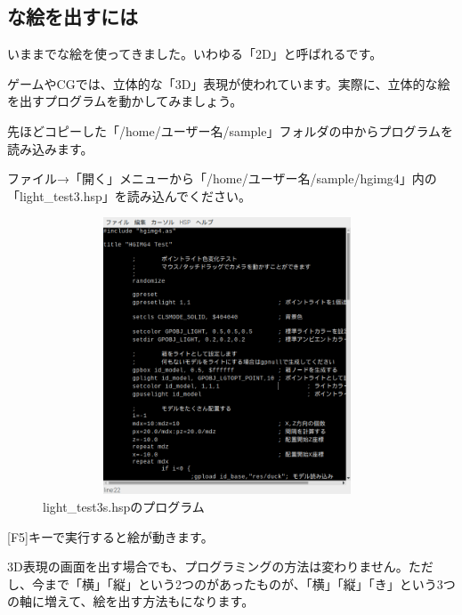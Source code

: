 \newpage
\subsection{な絵を出すには}

いままでな絵を使ってきました。いわゆる「2D」と呼ばれるです。

ゲームやCGでは、立体的な「3D」表現が使われています。実際に、立体的な絵を出すプログラムを動かしてみましょう。


先ほどコピーした「/home/ユーザー名/sample」フォルダの中からプログラムを読み込みます。

ファイル→「開く」メニューから「/home/ユーザー名/sample/hgimg4」内の「light\_test3.hsp」を読み込んでください。


\begin{figure}[H]
    \begin{center}
      \includegraphics[keepaspectratio,width=10.971cm,height=8.229cm]{text04-img/s_lighttest3s.png}
      \caption{light\_test3s.hspのプログラム}
    \end{center}
    \label{fig:prog_menu}
\end{figure}

[F5]キーで実行すると絵が動きます。

3D表現の画面を出す場合でも、プログラミングの方法は変わりません。ただし、今まで「横」「縦」という2つのがあったものが、「横」「縦」「き」という3つの軸に増えて、絵を出す方法もになります。

